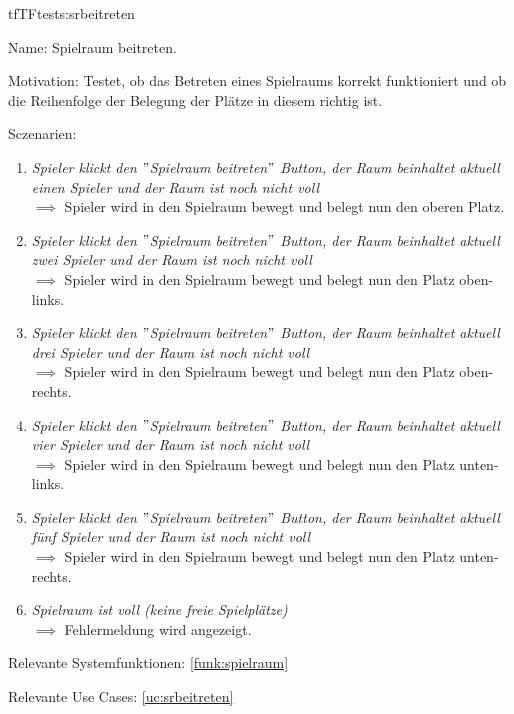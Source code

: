 \begin{description}[leftmargin=5em, style=sameline]
{
\begin{lhp}{tf}{TF}{tests:srbeitreten}
	\item [Name:] Spielraum beitreten.
	\item [Motivation:] Testet, ob das Betreten eines Spielraums korrekt funktioniert und ob die Reihenfolge der Belegung der Plätze in diesem richtig ist.
	
	\item [Sczenarien:] \hfill
		\begin{enumerate}
		\begin{comment}
		    \item \textit{Spieler klickt den $"$Spielraum beitreten$"$ Button und der Raum ist noch nicht voll} \\ $\implies$ Spieler wird in den Spielraum bewegt.
		 \end{comment}
			\item \textit{Spieler klickt den $"$Spielraum beitreten$"$ Button, der Raum beinhaltet aktuell einen Spieler und der Raum ist noch nicht voll} \\ $\implies$ Spieler wird in den Spielraum bewegt und belegt nun den oberen Platz.
			\item \textit{Spieler klickt den $"$Spielraum beitreten$"$ Button, der Raum beinhaltet aktuell zwei Spieler und der Raum ist noch nicht voll} \\ $\implies$ Spieler wird in den Spielraum bewegt und belegt nun den Platz oben-links.
			\item \textit{Spieler klickt den $"$Spielraum beitreten$"$ Button, der Raum beinhaltet aktuell drei Spieler und der Raum ist noch nicht voll} \\ $\implies$ Spieler wird in den Spielraum bewegt und belegt nun den Platz oben-rechts.
			\item \textit{Spieler klickt den $"$Spielraum beitreten$"$ Button, der Raum beinhaltet aktuell vier Spieler und der Raum ist noch nicht voll} \\ $\implies$ Spieler wird in den Spielraum bewegt und belegt nun den Platz unten-links.
			\item \textit{Spieler klickt den $"$Spielraum beitreten$"$ Button, der Raum beinhaltet aktuell fünf Spieler und der Raum ist noch nicht voll} \\ $\implies$ Spieler wird in den Spielraum bewegt und belegt nun den Platz unten-rechts.
			\item \textit{Spielraum ist voll (keine freie Spielplätze)} \\ $\implies$ Fehlermeldung wird angezeigt.
		\end{enumerate}
	\item [Relevante Systemfunktionen:] \ref{funk:spielraum}
	\item [Relevante Use Cases:] \ref{uc:srbeitreten}
\end{lhp}
}


\end{description}
